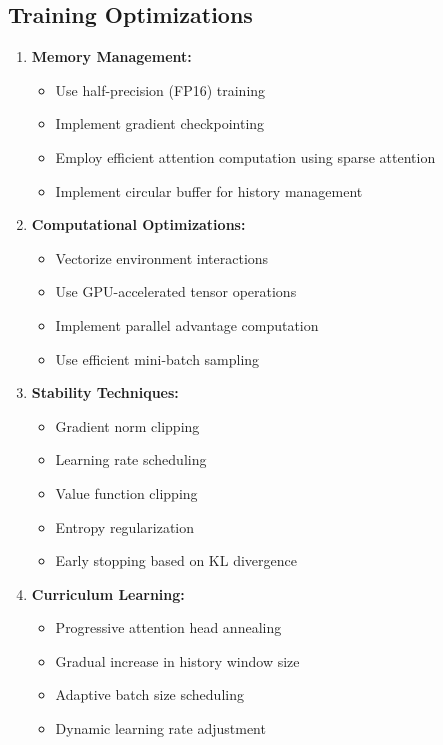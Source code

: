\subsection*{Training Optimizations}

\begin{enumerate}
\item \textbf{Memory Management:}
   \begin{itemize}
   \item Use half-precision (FP16) training
   \item Implement gradient checkpointing
   \item Employ efficient attention computation using sparse attention
   \item Implement circular buffer for history management
   \end{itemize}

\item \textbf{Computational Optimizations:}
   \begin{itemize}
   \item Vectorize environment interactions
   \item Use GPU-accelerated tensor operations
   \item Implement parallel advantage computation
   \item Use efficient mini-batch sampling
   \end{itemize}

\item \textbf{Stability Techniques:}
   \begin{itemize}
   \item Gradient norm clipping
   \item Learning rate scheduling
   \item Value function clipping
   \item Entropy regularization
   \item Early stopping based on KL divergence
   \end{itemize}

\item \textbf{Curriculum Learning:}
   \begin{itemize}
   \item Progressive attention head annealing
   \item Gradual increase in history window size
   \item Adaptive batch size scheduling
   \item Dynamic learning rate adjustment
   \end{itemize}
\end{enumerate}